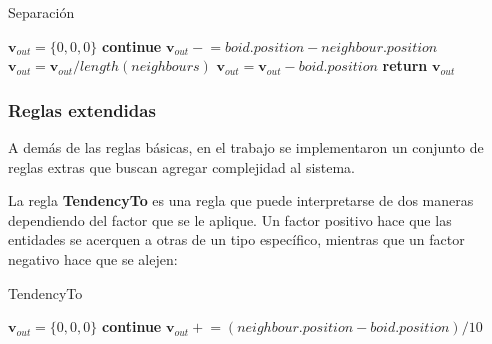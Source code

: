 \documentclass[a4paper]{article}
\begin{document}
            \begin{algorithm}
                \caption{Separación}\label{pseudo:separation}
                \begin{algorithmic}[1]
                    \State $\bm{v}_{out} = \{0, 0, 0\}$
                            \State \textbf{continue}
                        \EndIf
                        \State $\bm{v}_{out} \mathrel{-}= boid.position - neighbour.position$
                    \EndFor
                    \State $\bm{v}_{out} = \bm{v}_{out} / length(neighbours)$
                    \State $\bm{v}_{out} = \bm{v}_{out} - boid.position$
                    \State \textbf{return} $\bm{v}_{out}$
                    \EndProcedure
                \end{algorithmic}
            \end{algorithm}

            \pagebreak
            \subsubsection{Reglas extendidas}
                A demás de las reglas básicas, en el trabajo se implementaron un conjunto de reglas extras que buscan agregar complejidad al sistema.

                La regla \textbf{TendencyTo} es una regla que puede interpretarse de dos maneras dependiendo del factor que se le aplique. Un factor positivo hace que las entidades se acerquen a otras de un tipo específico, mientras que un factor negativo hace que se alejen:

                \begin{algorithm}
                    \caption{TendencyTo}\label{pseudo:tendency_to}
                    \begin{algorithmic}[1]
                            \State $\bm{v}_{out} = \{0, 0, 0\}$
                                    \State \textbf{continue}
                                \EndIf
                                \State $\bm{v}_{out} \mathrel{+}= (neighbour.position - boid.position) / 10$
                            \EndFor
                        \EndProcedure
                    \end{algorithmic}
                \end{algorithm}
\end{document}

